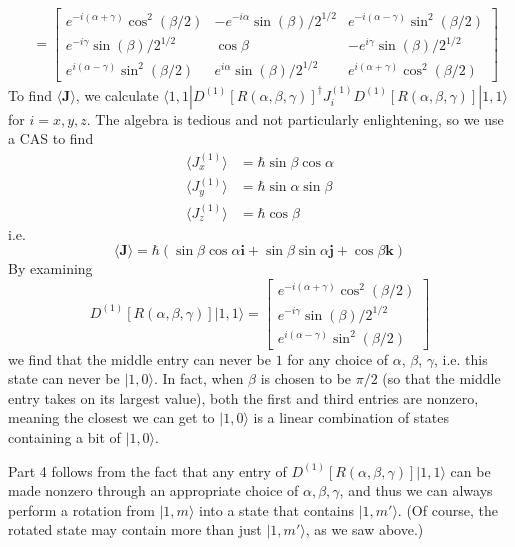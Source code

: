 \documentclass[../principles-of-quantum-mechanics.tex]{subfiles}
\begin{document}
\begin{questions}
\begin{solution}
\begin{align*}
				&= \begin{bmatrix}
					e^{-i(\alpha + \gamma)}\cos^2(\beta/2) & -e^{-i\alpha}\sin(\beta)/2^{1/2} & e^{-i(\alpha - \gamma)}\sin^2(\beta/2) \\
					e^{-i\gamma}\sin(\beta)/2^{1/2} & \cos\beta & -e^{i\gamma}\sin(\beta)/2^{1/2} \\
					e^{i(\alpha - \gamma)}\sin^2(\beta/2) & e^{i\alpha}\sin(\beta)/2^{1/2} & e^{i(\alpha + \gamma)}\cos^2(\beta/2)
				\end{bmatrix}
			\end{align*}
			To find $\langle \mathbf{J}\rangle$, we calculate $\langle 1, 1|D^{(1)}[R(\alpha, \beta, \gamma)]^\dagger J_i^{(1)}D^{(1)}[R(\alpha, \beta, \gamma)]|1, 1\rangle$ for $i = x, y, z$. The algebra is tedious and not particularly enlightening, so we use a CAS to find
			\begin{align*}
				\langle J_x^{(1)}\rangle &= \hbar\sin\beta\cos\alpha \\
				\langle J_y^{(1)}\rangle &= \hbar\sin\alpha\sin\beta \\
				\langle J_z^{(1)}\rangle &= \hbar\cos\beta
			\end{align*}
			i.e.
			$$\langle\mathbf{J}\rangle = \hbar(\sin\beta\cos\alpha\mathbf{i} + \sin\beta\sin\alpha\mathbf{j} + \cos\beta\mathbf{k})$$
			By examining
			$$D^{(1)}[R(\alpha, \beta, \gamma)]|1, 1\rangle = \begin{bmatrix}
			e^{-i(\alpha + \gamma)}\cos^2(\beta/2) \\
			e^{-i\gamma}\sin(\beta)/2^{1/2} \\
			e^{i(\alpha - \gamma)}\sin^2(\beta/2)
			\end{bmatrix}$$
			we find that the middle entry can never be $1$ for any choice of $\alpha$, $\beta$, $\gamma$, i.e. this state can never be $|1, 0\rangle$. In fact, when $\beta$ is chosen to be $\pi/2$ (so that the middle entry takes on its largest value), both the first and third entries are nonzero, meaning the closest we can get to $|1, 0\rangle$ is a linear combination of states containing a bit of $|1, 0\rangle$.
			
			Part 4 follows from the fact that any entry of $D^{(1)}[R(\alpha, \beta, \gamma)]|1, 1\rangle$ can be made nonzero through an appropriate choice of $\alpha, \beta, \gamma$, and thus we can always perform a rotation from $|1, m\rangle$ into a state that contains $|1, m'\rangle$. (Of course, the rotated state may contain more than just $|1, m'\rangle$, as we saw above.)
			

\end{solution}
\end{questions}
\end{document}
